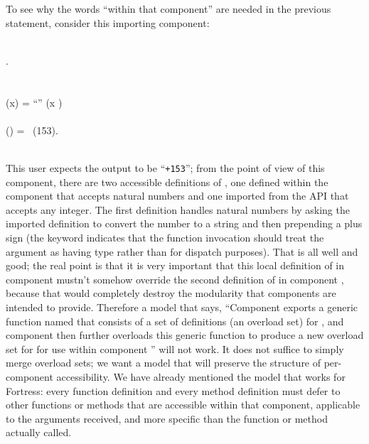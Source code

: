 To see why the words ``within that component'' are needed in the previous statement,
consider this importing component:
\begin{codeexamplesize}
\begin{FortressCode}
  \\
 .\lbrace\,\,\rbrace \\
  \\
 \\
(x\COLON {}) = \hbox{\rm{}``\STR{+}''} \mathrel{\Vert} (x  ) \\
 \\
(\ultrathin) = \, (153). \\
 \\
 
\end{FortressCode}
\end{codeexamplesize}
This user expects the output to be ``{\tt +153}''; from the point of view of
this component, there are two accessible definitions of , one defined
within the component that accepts natural numbers and one imported from the
 API that accepts any integer.
The first definition handles natural numbers by asking the
imported definition to convert the number to a string and
then prepending a plus sign (the  keyword indicates
that the function invocation  should treat the
argument as having type  rather than  for dispatch purposes).
That is all well and good; the real point is that it is very important
that this local definition of  in component 
mustn't somehow override the second definition of  in
component , because that would completely
destroy the modularity that components are intended to provide.
Therefore a model that says,
``Component  exports a generic function named 
that consists of a set of definitions (an overload set) for , and component
 then further overloads this generic function to
produce a new overload set for  for use within component '' will not work.
It does not suffice to simply merge overload sets;
we want a model that will preserve the structure of per-component accessibility.
We have already mentioned the model that works for Fortress:
every function definition and every method definition must
defer to other functions or methods that are accessible within that component,
applicable to the arguments received,
and more specific than the function or method actually called.

